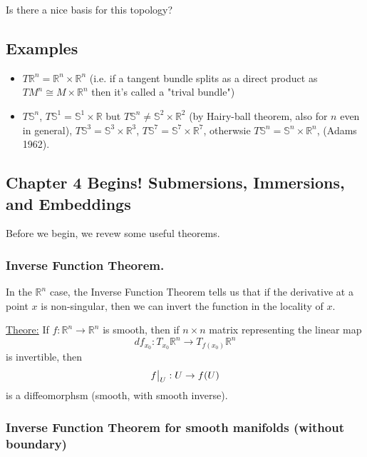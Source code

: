 \documentclass{article}
\newcommand{\R}{\mathbb{R}}
\newcommand{\restr}[2]{{%
  \left.\kern-\nulldelimiterspace %
  #1 %
  \vphantom{\big|} %
  \right|_{#2} %
  }}
\begin{document}
\vskip 0.5cm
\begin{dottedbox}
  Is there a nice basis for this topology?
\end{dottedbox}

\vskip 0.5cm
\subsection{Examples}
\begin{itemize}
  \item $T\R^n = \R^n \times \R^n$ (i.e. if a tangent bundle splits as a direct product as $TM^n \cong M \times \R^n$ then it's called a "trival bundle")
  \item $T\mathbb{S}^n$, $T\mathbb{S}^1 = \mathbb{S}^1 \times \R$ but $T\mathbb{S}^n \neq \mathbb{S}^2 \times \R^2 $ (by Hairy-ball theorem, also for $n$ even in general), $T\mathbb{S}^3 = \mathbb{S}^3 \times \R^3$, $T\mathbb{S}^7 = \mathbb{S}^7 \times \R^7$, otherwsie $T\mathbb{S}^n = \mathbb{S}^n \times \R^n$, (Adams 1962).
\end{itemize}

\vskip 1cm
\subsection{Chapter 4 Begins! Submersions, Immersions, and Embeddings}

Before we begin, we revew some useful theorems.

\subsubsection{Inverse Function Theorem.}

In the $\R^n$ case, the Inverse Function Theorem tells us that if the derivative at a point $x$ is non-singular, then we can invert the function in the locality of $x$.

\begin{dottedbox}
  \underline{Theore:} If $f : \R^n \rightarrow \R^n$ is smooth, then if $n \times n$ matrix representing the linear map
  \[ df_{x_0} : T_{x_0} \R^n \rightarrow T_{f(x_0)} \R^n \] 
  is invertible, then 
  \[ \restr{f}{U} : U \rightarrow f(U) \]
  is a diffeomorphsm (smooth, with smooth inverse).
\end{dottedbox}

\subsubsection{Inverse Function Theorem for smooth manifolds (without boundary)}
\end{document}
